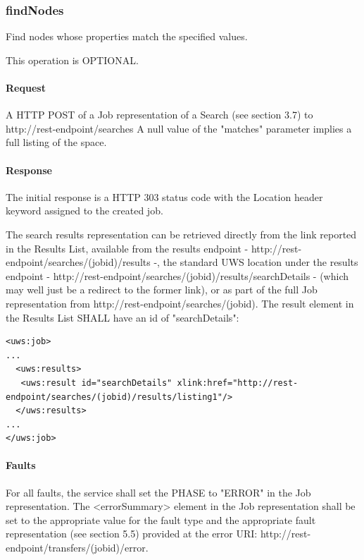 \documentclass[11pt,a4paper]{ivoa}
\begin{document}
\subsubsection{findNodes}
\label{subsubsec:findnodes}
Find nodes whose properties match the specified values.

This operation is OPTIONAL.

\paragraph{Request}
A HTTP POST of a Job representation of a Search (see section 3.7) to http://rest-endpoint/searches
A null value of the "matches" parameter implies a full listing of the space.

\paragraph{Response}
The initial response is a HTTP 303 status code with the Location header keyword assigned to the created job.

The search results representation can be retrieved directly from the link reported in the Results List, available from the results endpoint - http://rest-endpoint/searches/(jobid)/results -, the standard UWS location under the results endpoint - http://rest-endpoint/searches/(jobid)/results/searchDetails - (which may well just be a redirect to the former link), or as part of the full Job representation from http://rest-endpoint/searches/(jobid). The result element in the Results List SHALL have an id of "searchDetails":

\begin{lstlisting}
<uws:job>
...
  <uws:results>
   <uws:result id="searchDetails" xlink:href="http://rest-endpoint/searches/(jobid)/results/listing1"/>
  </uws:results>
...
</uws:job>
\end{lstlisting}

\paragraph{Faults}
For all faults, the service shall set the PHASE to "ERROR" in the Job representation. The <errorSummary> element in the Job representation shall be set to the appropriate value for the fault type and the appropriate fault representation (see section 5.5) provided at the error URI: http://rest-endpoint/transfers/(jobid)/error.
\end{document}
